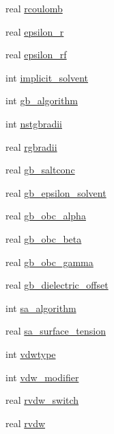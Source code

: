 \begin{DoxyCompactItemize}
\item 
real \hyperlink{structt__inputrec_aea3606718d11816b076fdc77c9948303}{rcoulomb}
\item 
real \hyperlink{structt__inputrec_a7f5f368d3be3dccfecb1a24cd8825168}{epsilon\-\_\-r}
\item 
real \hyperlink{structt__inputrec_ab51056e7e392a62962b10fac1a085eca}{epsilon\-\_\-rf}
\item 
int \hyperlink{structt__inputrec_ac11a8e311dc159467a1958e029e1d6a8}{implicit\-\_\-solvent}
\item 
int \hyperlink{structt__inputrec_a72618c7322b979d384e6ac0082ae156c}{gb\-\_\-algorithm}
\item 
int \hyperlink{structt__inputrec_a914be427a234006cef6952dfb4027b98}{nstgbradii}
\item 
real \hyperlink{structt__inputrec_a3c798d70a30872dc4b3deaff1b97722f}{rgbradii}
\item 
real \hyperlink{structt__inputrec_a0b2a85c41b552097d5fa385663c90355}{gb\-\_\-saltconc}
\item 
real \hyperlink{structt__inputrec_a384b89fd938891edfa4302ff0b6ed1db}{gb\-\_\-epsilon\-\_\-solvent}
\item 
real \hyperlink{structt__inputrec_a1227fb81d3960e8fcf71caba401ef8c1}{gb\-\_\-obc\-\_\-alpha}
\item 
real \hyperlink{structt__inputrec_a8e4a132fa7fea5febd6d8aec1562d4b9}{gb\-\_\-obc\-\_\-beta}
\item 
real \hyperlink{structt__inputrec_a2f25676e7e9d6456c40264fd2e7d7e0c}{gb\-\_\-obc\-\_\-gamma}
\item 
real \hyperlink{structt__inputrec_ad14a4ed2ffef0eaa63c3b763f011123b}{gb\-\_\-dielectric\-\_\-offset}
\item 
int \hyperlink{structt__inputrec_a1201437a54e4a74782ce9ae53509919a}{sa\-\_\-algorithm}
\item 
real \hyperlink{structt__inputrec_af7c280f9792a0a8f9d3483f87369ef86}{sa\-\_\-surface\-\_\-tension}
\item 
int \hyperlink{structt__inputrec_a593cfd822c74e671b95e1c031afdf415}{vdwtype}
\item 
int \hyperlink{structt__inputrec_a2ffc147ade42e456cff39bd9510cdf77}{vdw\-\_\-modifier}
\item 
real \hyperlink{structt__inputrec_aa376f7b462bc00a3745a979b21206feb}{rvdw\-\_\-switch}
\item 
real \hyperlink{structt__inputrec_aa183e4c17f2c80c6cf11d5ffe765ee77}{rvdw}
\item 

\end{DoxyCompactItemize}
